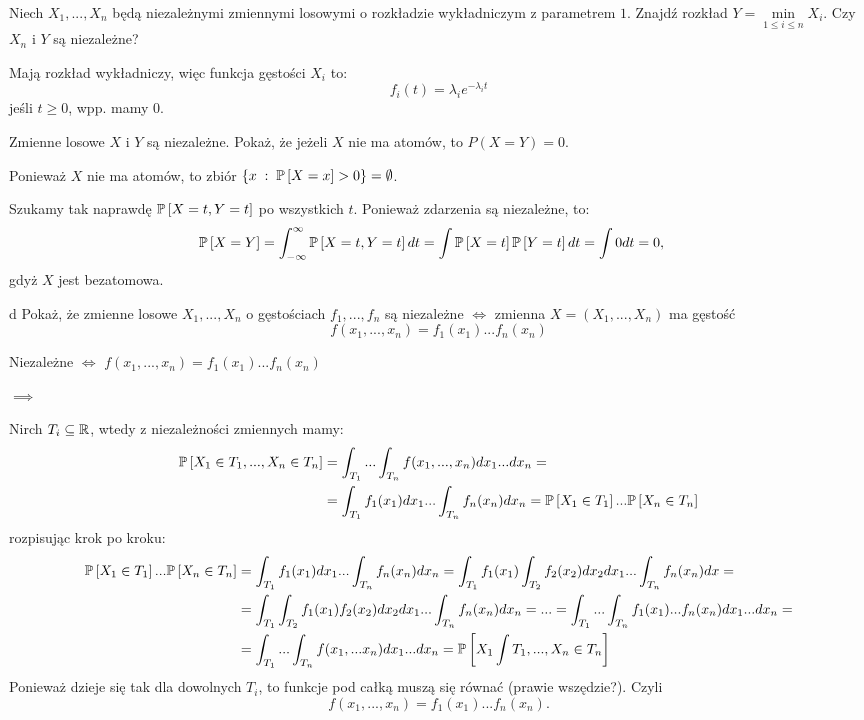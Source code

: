 \documentclass{article}
\begin{document}
\begin{problem}[4]{}
Niech $X_1,...,X_n$ będą niezależnymi zmiennymi losowymi o rozkładzie wykładniczym z parametrem $1$. Znajdź rozkład $Y=\min\limits_{1\leq i\leq n}X_i$. Czy $X_n$ i $Y$ są niezależne?
\end{problem}

Mają rozkład wykładniczy, więc funkcja gęstości $X_i$ to:
$$f_i(t)=\lambda_ie^{-\lambda_i t}$$
jeśli $t\geq 0$, wpp. mamy $0$.


\begin{problem}[5]{}
Zmienne losowe $X$ i $Y$ są niezależne. Pokaż, że jeżeli $X$ nie ma atomów, to $P(X=Y)=0$.
\end{problem}

Ponieważ $X$ nie ma atomów, to zbiór $\{x\;:\;\prob{X=x}>0\}=\emptyset$.

Szukamy tak naprawdę $\prob{X=t, Y=t}$ po wszystkich $t$. Ponieważ zdarzenia są niezależne, to:
\begin{align*}
    \prob{X=Y}&=\int_{-\infty}^\infty\prob{X=t, Y=t}dt=\int\prob{X=t}\prob{Y=t}dt=\int0dt=0,
\end{align*}
gdyż $X$ jest bezatomowa.

\begin{problem}[7]{d}
Pokaż, że zmienne losowe $X_1,...,X_n$ o gęstościach $f_1,...,f_n$ są niezależne $\iff$ zmienna $X=(X_1,...,X_n)$ ma gęstość
$$f(x_1,...,x_n)=f_1(x_1)...f_n(x_n)$$
\end{problem}

\begin{center}
Niezależne $\iff$ $f(x_1,...,x_n)=f_1(x_1)...f_n(x_n)$
\end{center}

$\implies$

Nirch $T_i\subseteq\mathbb{R}$, wtedy z niezależności zmiennych mamy:
\begin{align*}
    \prob{X_1\in T_1,...,X_n\in T_n}&=\int_{T_1}...\int_{T_n}f(x_1,...,x_n)dx_1...dx_n=\\
    &=\int_{T_1}f_1(x_1)dx_1...\int_{T_n}f_n(x_n)dx_n=\prob{X_1\in T_1}...\prob{X_n\in T_n}
\end{align*}
rozpisując krok po kroku:
\begin{align*}
    \prob{X_1\in T_1}...\prob{X_n\in T_n}&=\int_{T_1}f_1(x_1)dx_1...\int_{T_n}f_n(x_n)dx_n=\int_{T_1}f_1(x_1)\int_{T_2}f_2(x_2)dx_2dx_1...\int_{T_n}f_n(x_n)dx=\\
    &=\int_{T_1}\int_{T_2}f_1(x_1)f_2(x_2)dx_2dx_1...\int_{T_n}f_n(x_n)dx_n=...=\int_{T_1}...\int_{T_n}f_1(x_1)...f_n(x_n)dx_1...dx_n=\\
    &=\int_{T_1}...\int_{T_n}f(x_1,...x_n)dx_1...dx_n=\prob{X_1\int T_1,...,X_n\in T_n}
\end{align*}
Ponieważ dzieje się tak dla dowolnych $T_i$, to funkcje pod całką muszą się równać (prawie wszędzie?). Czyli
$$f(x_1,...,x_n)=f_1(x_1)...f_n(x_n).$$
\end{document}
